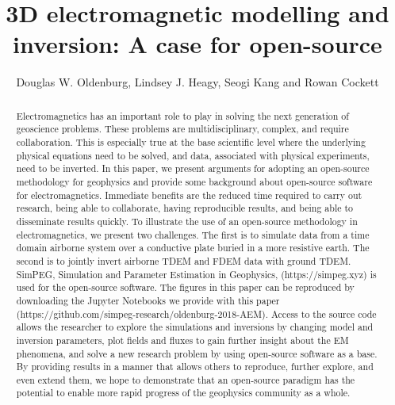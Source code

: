 \documentclass[paper]{geophysics}
\begin{document}
\title{3D electromagnetic modelling and inversion: A case for open-source}

\renewcommand{\thefootnote}{\fnsymbol{footnote}}



\author{Douglas W. Oldenburg\footnotemark[1], Lindsey J. Heagy, Seogi Kang and Rowan Cockett}


\maketitle

\begin{abstract}
Electromagnetics has an important role to play in solving the next generation of geoscience problems. These problems are multidisciplinary, complex, and require collaboration. This is especially true at the base scientific level where the underlying physical equations need to be solved, and data, associated with physical experiments, need to be inverted. In this paper, we present arguments for adopting an open-source methodology for geophysics and provide some background about open-source software for electromagnetics. Immediate benefits are the reduced time required to carry out research, being able to collaborate, having reproducible results, and being able to disseminate results quickly. To illustrate the use of an open-source methodology in electromagnetics, we present two challenges. The first is to simulate data from a time domain airborne system over a conductive plate buried in a more resistive earth. The second is to jointly invert airborne TDEM and FDEM data with ground TDEM. SimPEG, Simulation and Parameter Estimation in Geophysics, (https://simpeg.xyz) is used for the open-source software. The figures in this paper can be reproduced by downloading the Jupyter Notebooks we provide with this paper (https://github.com/simpeg-research/oldenburg-2018-AEM). Access to the source code allows the researcher to explore the simulations and inversions by changing model and inversion parameters, plot fields and fluxes to gain further insight about the EM phenomena, and solve a new research problem by using open-source software as a base. By providing results in a manner that allows others to reproduce, further explore, and even extend them, we hope to demonstrate that an open-source paradigm has the potential to enable more rapid progress of the geophysics community as a whole.
\end{abstract}
\end{document}

